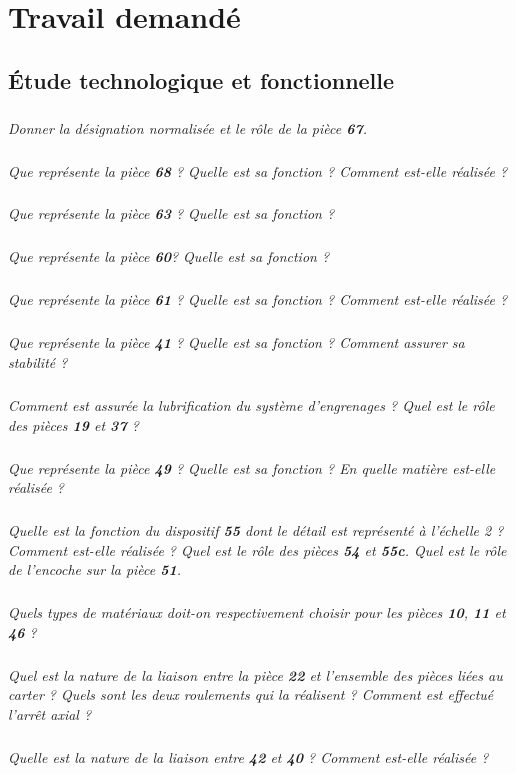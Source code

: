 \documentclass[10pt]{article}
\begin{document}
\section*{Travail demandé}

\subsection*{Étude technologique et fonctionnelle}

\subparagraph{}
\textit{Donner la désignation normalisée et le rôle de la pièce \textbf{67}.}

\subparagraph{}
\textit{Que représente la pièce \textbf{68} ? Quelle est sa fonction ? Comment est-elle réalisée ?}

\subparagraph{}
\textit{Que représente la pièce \textbf{63} ? Quelle est sa fonction ?}

\subparagraph{}
\textit{Que représente la pièce \textbf{60}? Quelle est sa fonction ?}

\subparagraph{}
\textit{Que représente la pièce \textbf{61} ? Quelle est sa fonction ? Comment est-elle réalisée ?}


\subparagraph{}
\textit{Que représente la pièce \textbf{41} ? Quelle est sa fonction ? Comment assurer sa stabilité ?}

\subparagraph{}
\textit{Comment est assurée la lubrification du système d'engrenages ? Quel est le rôle des pièces \textbf{19} et \textbf{37} ?}

\subparagraph{}
\textit{Que représente la pièce \textbf{49} ? Quelle est sa fonction ? En quelle matière est-elle réalisée ?}

\subparagraph{}
\textit{Quelle est la fonction du dispositif \textbf{55} dont le détail est représenté à l'échelle 2 ? Comment est-elle réalisée ? Quel est le rôle des pièces \textbf{54} et \textbf{55c}. Quel est le rôle de l'encoche sur la pièce \textbf{51}.}

\subparagraph{}
\textit{Quels types de matériaux doit-on respectivement choisir pour les pièces \textbf{10}, \textbf{11} et \textbf{46} ?}

\subparagraph{}
\textit{Quel est la nature de la liaison entre la pièce \textbf{22} et l'ensemble des pièces liées au carter ? Quels sont les deux roulements qui la réalisent ? Comment est effectué l'arrêt axial ?}

\subparagraph{}
\textit{Quelle est la nature de la liaison entre \textbf{42} et \textbf{40} ? Comment est-elle réalisée ?}
\end{document}
